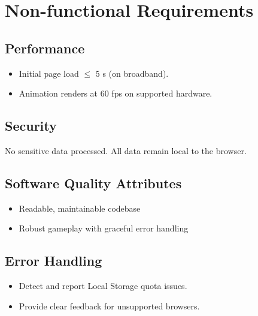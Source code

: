 \documentclass[11pt]{scrreprt}
\begin{document}
\chapter{Non-functional Requirements}

\section{Performance}
\begin{itemize}
  \item Initial page load $\leq$ 5 s (on broadband).
  \item Animation renders at 60 fps on supported hardware.
\end{itemize}

\section{Security}
No sensitive data processed. All data remain local to the browser.

\section{Software Quality Attributes}
\begin{itemize}
  \item Readable, maintainable codebase
  \item Robust gameplay with graceful error handling
\end{itemize}

\section{Error Handling}
\begin{itemize}
  \item Detect and report Local Storage quota issues.
  \item Provide clear feedback for unsupported browsers.
\end{itemize}

\end{document}
